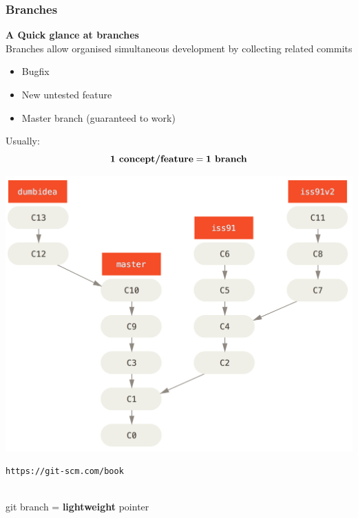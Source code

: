 \documentclass{beamer}
\begin{document}

\begin{frame}
  \frametitle{Branches}
  \textbf{\Large A Quick glance at branches}\\[1ex]
  Branches allow organised simultaneous development by collecting related 
  commits\\
  \begin{minipage}{0.45\linewidth}
  \begin{itemize}
    \item Bugfix
    \item New untested feature
    \item Master branch (guaranteed to work)
  \end{itemize}
  Usually:
  \begin{equation*}
    \text{\textbf{1 concept/feature}} = \text{\textbf{1 branch}}
  \end{equation*}
  \end{minipage}
  \hfill
  \begin{minipage}{0.45\linewidth}
  \begin{center}
    \includegraphics[width=0.95\linewidth]{topic-branches-1.png}
  \end{center}
  {\footnotesize \texttt{https://git-scm.com/book}}
  \end{minipage}\\[2ex]
  git branch = \textbf{lightweight} pointer
\end{frame}

\end{document}

